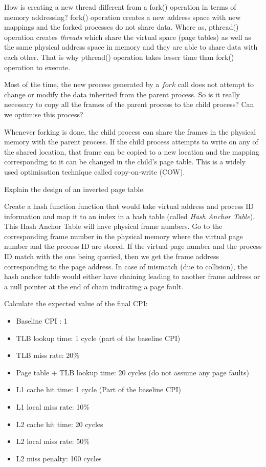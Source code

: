 \begin{ExerciseList}
\Exercise
How is creating a new thread different from a fork() operation in terms of memory
addressing?
\Answer
fork() operation creates a new address space with new mappings and the forked processes do not share data. Where as,
pthread() operation creates {\em threads} which share the virtual space (page tables) as well as the same physical
address space in memory and they are able to share data with each other. That is why pthread() operation takes lesser
time than fork() operation to execute.

\Exercise
Most of the time, the new process generated by a $fork$ call does not attempt to change or modify the data inherited
from the parent process. So is it really necessary to copy all the frames of the parent process to  
the child process? Can we optimise this process?

\Answer
Whenever forking is done, the child process can share the frames in the physical memory with the parent process. If the
child process attempts to write on any of the shared location, that frame can be copied to a new location and the
mapping corresponding to it can be changed in the child's page table. This is a widely used optimisation technique
called copy-on-write (COW).


\Exercise
Explain the design of an inverted page table.

\Answer
Create a hash function function that would take virtual address and process ID information and map it to an index in a
hash table (called {\em Hash Anchor Table}). This Hash Anchor Table will have physical frame numbers. Go to the
corresponding frame number in the physical memory where the virtual page number and the process ID are stored. If the
virtual page number and the process ID match with the one being queried, then we get the frame address corresponding to
the page address. In case of mismatch (due to collision), the hash anchor table would either have chaining leading to
another frame address or a null pointer at the end of chain indicating a page fault.



\Exercise[difficulty=1]
Calculate the expected value of the final CPI:

\begin{itemize}
\item Baseline CPI : 1
\item TLB lookup time: 1 cycle (part of the baseline CPI)
\item TLB miss rate: 20\%
\item Page table + TLB lookup time: 20 cycles (do not assume any page faults)
\item L1 cache hit time: 1 cycle (Part of the baseline CPI)
\item L1 local miss rate: 10\%
\item L2 cache hit time: 20 cycles
\item L2 local miss rate: 50\%
\item L2 miss penalty: 100 cycles
\end{itemize}



\end{ExerciseList}
